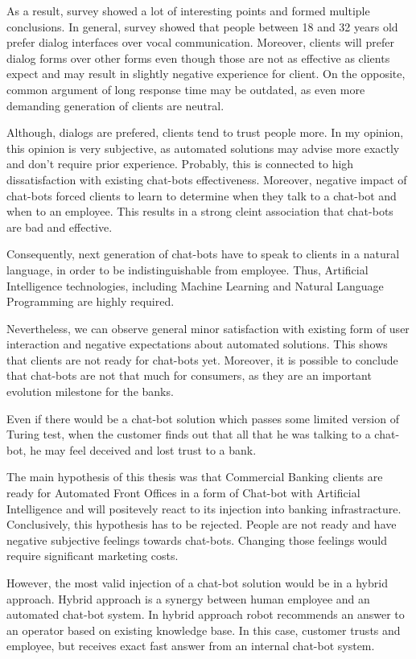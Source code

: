 As a result, survey showed a lot of interesting points and formed multiple conclusions.
In general, survey showed that people between 18 and 32 years old prefer dialog interfaces over vocal communication.
Moreover, clients will prefer dialog forms over other forms even though those are not as effective as clients expect and may result in slightly negative experience for client.
On the opposite, common argument of long response time may be outdated, as even more demanding generation of clients are neutral.

Although, dialogs are prefered, clients tend to trust people more.
In my opinion, this opinion is very subjective, as automated solutions may advise more exactly and don't require prior experience.
Probably, this is connected to high dissatisfaction with existing chat-bots effectiveness.
Moreover, negative impact of chat-bots forced clients to learn to determine when they talk to a chat-bot and when to an employee.
This results in a strong cleint association that chat-bots are bad and effective.

Consequently, next generation of chat-bots have to speak to clients in a natural language, in order to be indistinguishable from employee.
Thus, Artificial Intelligence technologies, including Machine Learning and Natural Language Programming are highly required.

Nevertheless, we can observe general minor satisfaction with existing form of user interaction and negative expectations about automated solutions.
This shows that clients are not ready for chat-bots yet.
Moreover, it is possible to conclude that chat-bots are not that much for consumers, as they are an important evolution milestone for the banks.

Even if there would be a chat-bot solution which passes some limited version of Turing test, when the customer finds
out that all that he was talking to a chat-bot, he may feel deceived and lost trust to a bank.

The main hypothesis of this thesis was that Commercial Banking clients are ready for Automated Front Offices in a form of Chat-bot with Artificial Intelligence and will positevely react to its injection into banking infrastracture.
Conclusively, this hypothesis has to be rejected.
People are not ready and have negative subjective feelings towards chat-bots.
Changing those feelings would require significant marketing costs.

However, the most valid injection of a chat-bot solution would be in a hybrid approach.
Hybrid approach is a synergy between human employee and an automated chat-bot system.
In hybrid approach robot recommends an answer to an operator based on existing knowledge base.
In this case, customer trusts and employee, but receives exact fast answer from an internal chat-bot system.